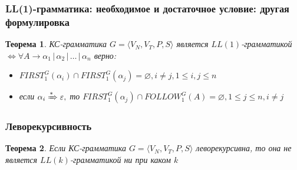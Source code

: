 \documentclass{beamer}
\newtheorem{rutheorem}{Теорема}
\newcommand{\derive}[0]{\xRightarrow[]{*}}
\begin{document}
\begin{frame}[fragile]
  \transwipe[direction=90]
  \frametitle{LL(1)-грамматика: необходимое и достаточное условие: другая формулировка}
  \begin{rutheorem}
    КС-грамматика  $G = \langle V_N, V_T, P, S \rangle$ является $LL(1)$-грамматикой $\Leftrightarrow 
    \forall A \rightarrow \alpha_1 \, | \, \alpha_2 \, | \, \dots \, | \, \alpha_n$ верно: 
    \begin{itemize}
      \item $FIRST^G_1(\alpha_i) \cap FIRST^G_1(\alpha_j) = \varnothing, i \neq j, 1 \leq i, j \leq n$
      \item если $\alpha_i \derive \varepsilon,$ то $FIRST^G_1(\alpha_j) \cap FOLLOW^G_1(A) = \varnothing, 1 \leq j \leq n, i \neq j$
    \end{itemize}
   \end{rutheorem}
  
\end{frame}


\begin{frame}[fragile]
  \transwipe[direction=90]
  \frametitle{Леворекурсивность}
  \begin{rutheorem}
    Если  КС-грамматика  $G = \langle V_N, V_T, P, S \rangle$ леворекурсивна, то она не является $LL(k)$-грамматикой ни при каком $k$
  \end{rutheorem}
\end{frame}

 
   
\end{document}
